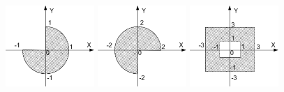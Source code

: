 \begin{figure}[h]%
\begin{floatrow}[3]
{\includegraphics[width=0.30\textwidth,keepaspectratio]{img/ris_3_79}}
{\includegraphics[width=0.30\textwidth,keepaspectratio]{img/ris_3_80}}
{\includegraphics[width=0.30\textwidth,keepaspectratio]{img/ris_3_81}}
\end{floatrow}
\end{figure}%

